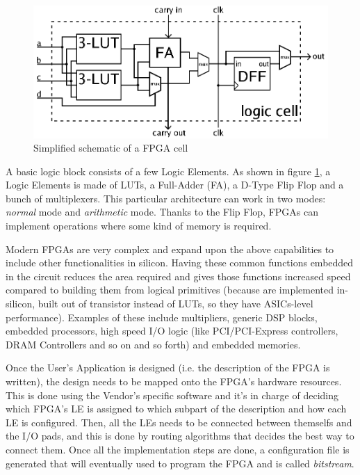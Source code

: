 \begin{figure}[H]
\centering
\includegraphics[width=1.0\linewidth]{images/chapter2/FPGA_cell_example.png}
\caption{Simplified schematic of a FPGA cell}
\label{fig:fpga_cell}
\end{figure}

A basic logic block consists of a few Logic Elements. As shown in figure \ref{fig:fpga_cell}, a Logic Elements is made of LUTs, a Full-Adder (FA), a D-Type Flip Flop and a bunch of multiplexers. This particular architecture can work in two modes: \textit{normal} mode and \textit{arithmetic} mode. Thanks to the Flip Flop, FPGAs can implement operations where some kind of memory is required.\bigskip

Modern FPGAs are very complex and expand upon the above capabilities to include other functionalities in silicon. Having these common functions embedded in the circuit reduces the area required and gives those functions increased speed compared to building them from logical primitives (because are implemented in-silicon, built out of transistor instead of LUTs, so they have ASICs-level performance). Examples of these include multipliers, generic DSP blocks, embedded processors, high speed I/O logic (like PCI/PCI-Express controllers, DRAM Controllers and so on and so forth) and embedded memories. \bigskip

Once the User's Application is designed (i.e. the description of the FPGA is written), the design needs to be mapped onto the FPGA's hardware resources. This is done using the Vendor's specific software and it's in charge of deciding which FPGA's LE is assigned to which subpart of the description and how each LE is configured. Then, all the LEs needs to be connected between themselfs and the I/O pads, and this is done by routing algorithms that decides the best way to connect them. Once all the implementation steps are done, a configuration file is generated that will eventually used to program the FPGA and is called \textit{bitstream}.\bigskip

